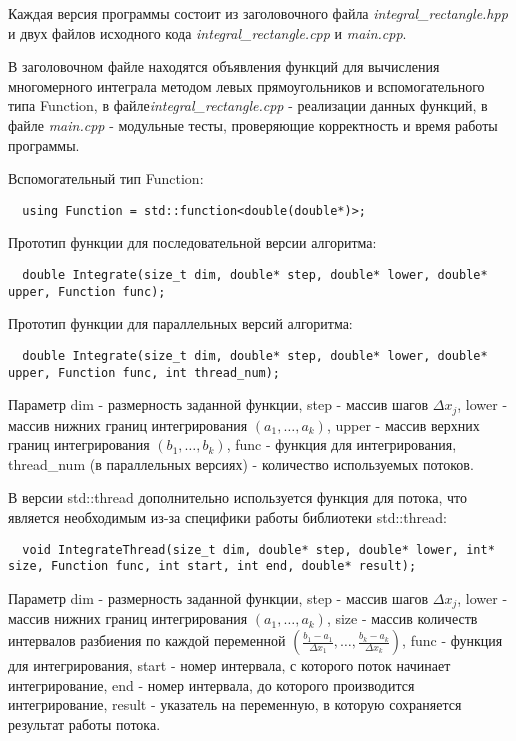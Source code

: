 \documentclass{report}
\begin{document}
\par Каждая версия программы состоит из заголовочного файла \emph{integral\_rectangle.hpp} и двух файлов исходного кода \emph{integral\_rectangle.cpp} и \emph{main.cpp}.
\par В заголовочном файле находятся объявления функций для вычисления многомерного интеграла методом левых прямоугольников и вспомогательного типа Function, в файле\break \emph{integral\_rectangle.cpp} - реализации данных функций, в файле \emph{main.cpp} - модульные тесты, проверяющие корректность и время работы программы.
\par Вспомогательный тип Function:
\begin{lstlisting}
  using Function = std::function<double(double*)>;
\end{lstlisting}
\par Прототип функции для последовательной версии алгоритма:
\begin{lstlisting}
  double Integrate(size_t dim, double* step, double* lower, double* upper, Function func);
\end{lstlisting}
\par Прототип функции для параллельных версий алгоритма:
\begin{lstlisting}
  double Integrate(size_t dim, double* step, double* lower, double* upper, Function func, int thread_num);
\end{lstlisting}
\par Параметр dim - размерность заданной функции, step - массив шагов \( \Delta x_j \), lower - массив нижних границ интегрирования \( (a_1, \dots, a_k) \), upper - массив верхних границ интегрирования \( (b_1, \dots, b_k) \), func - функция для интегрирования, thread\_num (в параллельных версиях) - количество используемых потоков.
\par В версии std::thread дополнительно используется функция для потока, что является необходимым из-за специфики работы библиотеки std::thread:
\begin{lstlisting}
  void IntegrateThread(size_t dim, double* step, double* lower, int* size, Function func, int start, int end, double* result);
\end{lstlisting}
\par Параметр dim - размерность заданной функции, step - массив шагов \( \Delta x_j \), lower - массив нижних границ интегрирования \( (a_1, \dots, a_k) \), size - массив количеств интервалов разбиения по каждой переменной \( (\frac{b_1 - a_1}{\Delta x_1}, \dots, \frac{b_k - a_k}{\Delta x_k}) \), func - функция для интегрирования, start - номер интервала, с которого поток начинает интегрирование, end - номер интервала, до которого производится интегрирование, result - указатель на переменную, в которую сохраняется результат работы потока.
\end{document}
